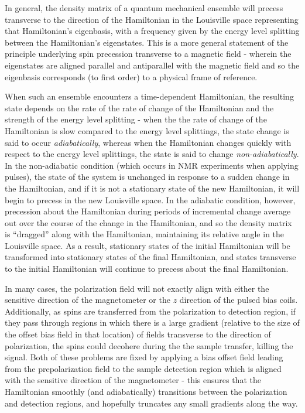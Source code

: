 \documentclass[PaulGanssle-Thesis.tex]{subfiles}
\begin{document}
In general, the density matrix of a quantum mechanical ensemble will precess transverse to the direction of the Hamiltonian in the Louisville space representing that Hamiltonian's eigenbasis, with a frequency given by the energy level splitting between the Hamiltonian's eigenstates. This is a more general statement of the principle underlying spin precession transverse to a magnetic field - wherein the eigenstates are aligned parallel and antiparallel with the magnetic field and so the eigenbasis corresponds (to first order) to a physical frame of reference.

When such an ensemble encounters a time-dependent Hamiltonian, the resulting state depends on the rate of the rate of change of the Hamiltonian and the strength of the energy level splitting - when the the rate of change of the Hamiltonian is slow compared to the energy level splittings, the state change is said to occur \textit{adiabatically}, whereas when the Hamiltonian changes quickly with respect to the energy level splittings, the state is said to change \textit{non-adiabatically}. In the non-adiabatic condition (which occurs in NMR experiments when applying pulses), the state of the system is unchanged in response to a sudden change in the Hamiltonian, and if it is not a stationary state of the new Hamiltonian, it will begin to precess in the new Louisville space. In the adiabatic condition, however, precession about the Hamiltonian during periods of incremental change average out over the course of the change in the Hamiltonian, and so the density matrix is ``dragged'' along with the Hamiltonian, maintaining its relative angle in the Louisville space. As a result, stationary states of the initial Hamiltonian will be transformed into stationary states of the final Hamiltonian, and states transverse to the initial Hamiltonian will continue to precess about the final Hamiltonian.

In many cases, the polarization field will not exactly align with either the sensitive direction of the magnetometer or the $z$ direction of the pulsed bias coils. Additionally, as spins are transferred from the polarization to detection region, if they pass through regions in which there is a large gradient (relative to the size of the offset bias field in that location) of fields transverse to the direction of polarization, the spins could decohere during the the sample transfer, killing the signal. Both of these problems are fixed by applying a bias offset field leading from the prepolarization field to the sample detection region which is aligned with the sensitive direction of the magnetometer - this ensures that the Hamiltonian smoothly (and adiabatically) transitions between the polarization and detection regions, and hopefully truncates any small gradients along the way.
\end{document}
